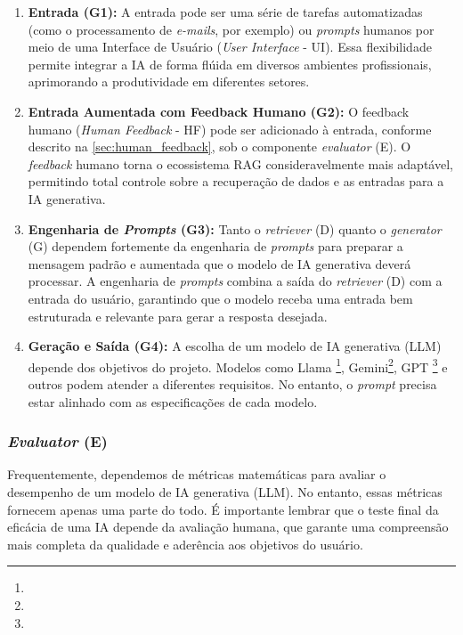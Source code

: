 \documentclass[a4paper, 12pt]{article}
\begin{document}
    \begin{enumerate}
        \item \textbf{Entrada (G1):} A entrada pode ser uma série de tarefas automatizadas (como o processamento de \textit{e-mails}, por exemplo) ou \textit{prompts} humanos por meio de uma Interface de Usuário (\textit{User Interface} - UI). Essa flexibilidade permite integrar a IA de forma flúida em diversos ambientes profissionais, aprimorando a produtividade em diferentes setores.
        \item \textbf{Entrada Aumentada com Feedback Humano (G2):} O feedback humano (\textit{Human Feedback} - HF) pode ser adicionado à entrada, conforme descrito na \autoref{sec:human_feedback}, sob o componente \textit{evaluator} (E). O \textit{feedback} humano torna o ecossistema RAG consideravelmente mais adaptável, permitindo total controle sobre a recuperação de dados e as entradas para a IA generativa.
        \item \textbf{Engenharia de \textit{Prompts} (G3):} Tanto o \textit{retriever} (D) quanto o \textit{generator} (G) dependem fortemente da engenharia de \textit{prompts} para preparar a mensagem padrão e aumentada que o modelo de IA generativa deverá processar. A engenharia de \textit{prompts} combina a saída do \textit{retriever} (D) com a entrada do usuário, garantindo que o modelo receba uma entrada bem estruturada e relevante para gerar a resposta desejada.
        \item \textbf{Geração e Saída (G4):} A escolha de um modelo de IA generativa (LLM) depende dos objetivos do projeto. Modelos como Llama \footnote{}, Gemini\footnote{}, GPT \footnote{} e outros podem atender a diferentes requisitos. No entanto, o \textit{prompt} precisa estar alinhado com as especificações de cada modelo.
    \end{enumerate}

    \subsubsection{\textit{Evaluator} (E)}

    Frequentemente, dependemos de métricas matemáticas para avaliar o desempenho de um modelo de IA generativa (LLM). No entanto, essas métricas fornecem apenas uma parte do todo. É importante lembrar que o teste final da eficácia de uma IA depende da avaliação humana, que garante uma compreensão mais completa da qualidade e aderência aos objetivos do usuário.
\end{document}
